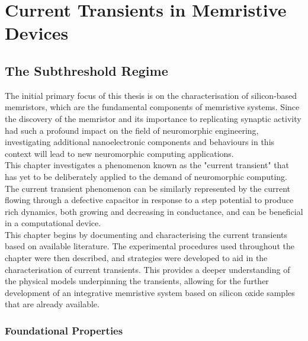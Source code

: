 \chapter{Current Transients in Memristive Devices}


\section[The Subthreshold Regime]{The Subthreshold Regime}

The initial primary focus of this thesis is on the characterisation of silicon-based memristors, which are the fundamental components of memristive systems. Since the discovery of the memristor and its importance to replicating synaptic activity had such a profound impact on the field of neuromorphic engineering, investigating additional nanoelectronic components and behaviours in this context will lead to new neuromorphic computing applications. \\

\noindent This chapter investigates a phenomenon known as the "current transient" that has yet to be deliberately applied to the demand of neuromorphic computing. The current transient phenomenon can be similarly represented by the current flowing through a defective capacitor in response to a step potential to produce rich dynamics, both growing and decreasing in conductance, and can be beneficial in a computational device. \\

\noindent This chapter begins by documenting and characterising the current transients based on available literature. The experimental procedures used throughout the chapter were then described, and strategies were developed to aid in the characterisation of current transients. This provides a deeper understanding of the physical models underpinning the transients, allowing for the further development of an integrative memristive system based on silicon oxide samples that are already available.

\subsection[Foundational Properties]{Foundational Properties}

